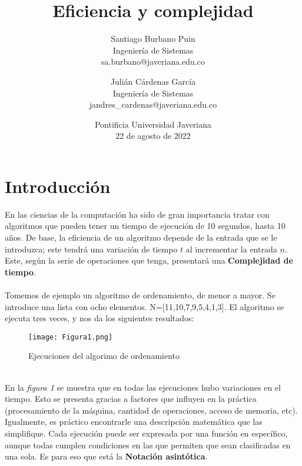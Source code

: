 \documentclass{article}
\title{\textbf{Eficiencia y complejidad}}
\author{Santiago Burbano Puin \\Ingeniería de Sistemas\\ sa.burbano@javeriana.edu.co \and Julián Cárdenas García \\ Ingeniería de Sistemas\\ jandres\_cardenas@javeriana.edu.co}
\date{Pontificia Universidad Javeriana\\22 de agosto de 2022}
\begin{document}
\maketitle

\section{Introducción}
En las ciencias de la computación ha sido de gran importancia tratar con algoritmos que pueden tener un tiempo de ejecución de 10 segundos, hasta 10 años. De base, la eficiencia de un algoritmo depende de la entrada que se le introduzca; este tendrá una variación de tiempo $t$ al incrementar la entrada $n$. Este, según la serie de operaciones que tenga, presentará una \textbf{Complejidad de tiempo}.
\\\\
Tomemos de ejemplo un algoritmo de ordenamiento, de menor a mayor. Se introduce una lista con ocho elementos. N=[11,10,7,9,5,4,1,3]. El algoritmo se ejecuta tres veces, y nos da los siguientes resultados:
\\
\begin{figure}[h]
    \centering
        \texttt{[image: Figura1.png]}
        \caption{Ejecuciones del algorimo de ordenamiento}
    \label{fig:1}
\end{figure}
\\
En la \textit{figura 1} se muestra que en todas las ejecuciones hubo variaciones en el tiempo. Esto se presenta gracias a factores que influyen en la práctica (procesamiento de la máquina, cantidad de operaciones, acceso de memoria, etc). Igualmente, es práctico encontrarle una descripción matemática que las simplifique. Cada ejecución puede ser expresada por una función en específico, aunque todas cumplen condiciones en las que permiten que sean clasificadas en una sola. Es para eso que está la \textbf{Notación asintótica}.
\end{document}
